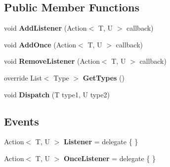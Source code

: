 \subsection*{Public Member Functions}
\begin{DoxyCompactItemize}
\item 
\hypertarget{classstrange_1_1extensions_1_1signal_1_1impl_1_1_signal_3_01_t_00_01_u_01_4_a1b0058cb66f0539b09689453534544ab}{void {\bfseries Add\-Listener} (Action$<$ T, U $>$ callback)}\label{classstrange_1_1extensions_1_1signal_1_1impl_1_1_signal_3_01_t_00_01_u_01_4_a1b0058cb66f0539b09689453534544ab}

\item 
\hypertarget{classstrange_1_1extensions_1_1signal_1_1impl_1_1_signal_3_01_t_00_01_u_01_4_abb6c038d9f048a78a7a12db57b69bc28}{void {\bfseries Add\-Once} (Action$<$ T, U $>$ callback)}\label{classstrange_1_1extensions_1_1signal_1_1impl_1_1_signal_3_01_t_00_01_u_01_4_abb6c038d9f048a78a7a12db57b69bc28}

\item 
\hypertarget{classstrange_1_1extensions_1_1signal_1_1impl_1_1_signal_3_01_t_00_01_u_01_4_a2cd8bd999662f693d23e1af1eccc7dc6}{void {\bfseries Remove\-Listener} (Action$<$ T, U $>$ callback)}\label{classstrange_1_1extensions_1_1signal_1_1impl_1_1_signal_3_01_t_00_01_u_01_4_a2cd8bd999662f693d23e1af1eccc7dc6}

\item 
\hypertarget{classstrange_1_1extensions_1_1signal_1_1impl_1_1_signal_3_01_t_00_01_u_01_4_a42f267676553b05e6aef6d43784e17e7}{override List$<$ Type $>$ {\bfseries Get\-Types} ()}\label{classstrange_1_1extensions_1_1signal_1_1impl_1_1_signal_3_01_t_00_01_u_01_4_a42f267676553b05e6aef6d43784e17e7}

\item 
\hypertarget{classstrange_1_1extensions_1_1signal_1_1impl_1_1_signal_3_01_t_00_01_u_01_4_a4a9526657914a391a576c2b4f9ebe34b}{void {\bfseries Dispatch} (T type1, U type2)}\label{classstrange_1_1extensions_1_1signal_1_1impl_1_1_signal_3_01_t_00_01_u_01_4_a4a9526657914a391a576c2b4f9ebe34b}

\end{DoxyCompactItemize}
\subsection*{Events}
\begin{DoxyCompactItemize}
\item 
\hypertarget{classstrange_1_1extensions_1_1signal_1_1impl_1_1_signal_3_01_t_00_01_u_01_4_a681c756832eb796c4b14b7630478ad6e}{Action$<$ T, U $>$ {\bfseries Listener} = delegate \{ \}}\label{classstrange_1_1extensions_1_1signal_1_1impl_1_1_signal_3_01_t_00_01_u_01_4_a681c756832eb796c4b14b7630478ad6e}

\item 
\hypertarget{classstrange_1_1extensions_1_1signal_1_1impl_1_1_signal_3_01_t_00_01_u_01_4_acb47a36eb3ad02e4e943ea5b890a8794}{Action$<$ T, U $>$ {\bfseries Once\-Listener} = delegate \{ \}}\label{classstrange_1_1extensions_1_1signal_1_1impl_1_1_signal_3_01_t_00_01_u_01_4_acb47a36eb3ad02e4e943ea5b890a8794}

\end{DoxyCompactItemize}


